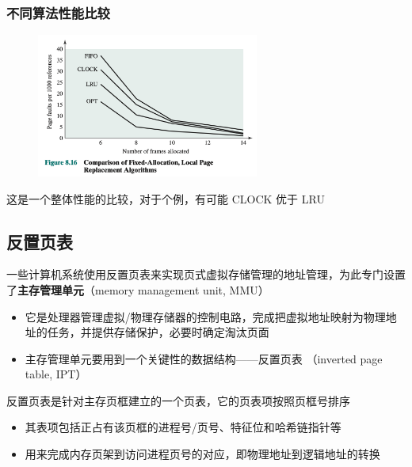 \documentclass[cs4size,a4paper,10pt]{ctexart}
\begin{document}
		\subsubsection{不同算法性能比较}
		\begin{figure}[H]
			\centering
			\includegraphics[width=0.65\textwidth]{img/3.3.5.6}
		\end{figure}
		这是一个整体性能的比较，对于个例，有可能 CLOCK 优于 LRU

		\subsection{反置页表}
		一些计算机系统使用反置页表来实现页式虚拟存储管理的地址管理，为此专门设置了\textbf{主存管理单元}（memory management unit, MMU）
		\begin{itemize}
			\item 它是处理器管理虚拟/物理存储器的控制电路，完成把虚拟地址映射为物理地址的任务，并提供存储保护，必要时确定淘汰页面
			\item 主存管理单元要用到一个关键性的数据结构——反置页表 （inverted page table, IPT）
		\end{itemize}

		反置页表是针对主存页框建立的一个页表，它的页表项按照页框号排序
		\begin{itemize}
			\item 其表项包括正占有该页框的进程号/页号、特征位和哈希链指针等
			\item 用来完成内存页架到访问进程页号的对应，即物理地址到逻辑地址的转换
		\end{itemize}
\end{document}
